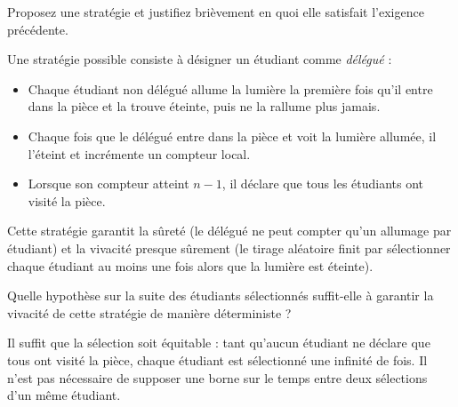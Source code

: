 \begin{exercice}
  \begin{questions}
  \item Proposez une stratégie et justifiez brièvement en quoi elle satisfait l'exigence précédente.
  \end{questions}
  \begin{corrections}
    Une stratégie possible consiste à désigner un étudiant comme \emph{délégué} :
    \begin{itemize}
    \item Chaque étudiant non délégué allume la lumière la première fois qu'il entre
      dans la pièce et la trouve éteinte, puis ne la rallume plus jamais.
    \item Chaque fois que le délégué entre dans la pièce et voit la lumière allumée,
      il l'éteint et incrémente un compteur local.
    \item Lorsque son compteur atteint $n-1$, il déclare que tous les étudiants ont visité la pièce.
    \end{itemize}
    Cette stratégie garantit la sûreté (le délégué ne peut compter qu'un allumage par étudiant)
    et la vivacité presque sûrement (le tirage aléatoire finit par sélectionner chaque étudiant
    au moins une fois alors que la lumière est éteinte).
  \end{corrections}

  \begin{questions}
  \item Quelle hypothèse sur la suite des étudiants sélectionnés suffit-elle
    à garantir la vivacité de cette stratégie de manière déterministe ?
  \end{questions}
  \begin{corrections}
    Il suffit que la sélection soit équitable : tant qu'aucun étudiant ne déclare
    que tous ont visité la pièce, chaque étudiant est sélectionné une infinité de fois.
    Il n'est pas nécessaire de supposer une borne sur le temps entre deux sélections
    d'un même étudiant.
  \end{corrections}
  
\end{exercice}

\endgroup
\endinput
